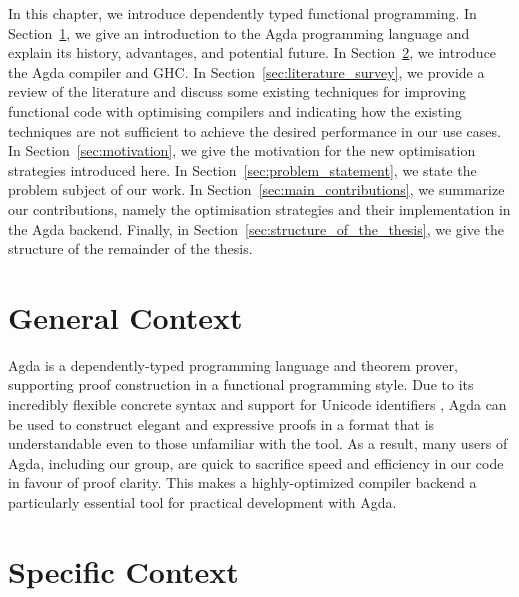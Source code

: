 In this chapter, we introduce dependently typed functional programming. In Section~\ref{sec:general_context}, we give an introduction to the Agda programming language and explain its history, advantages, and potential future. In Section~\ref{sec:specific_context}, we introduce the Agda compiler and GHC. In Section~\ref{sec:literature_survey}, we provide a review of the literature and discuss some existing techniques for improving functional code with optimising compilers and indicating how the existing techniques are not sufficient to achieve the desired performance in our use cases. In Section~\ref{sec:motivation}, we give the motivation for the new optimisation strategies introduced here. In Section~\ref{sec:problem_statement}, we state the problem subject of our work. In Section~\ref{sec:main_contributions}, we summarize our contributions, namely the optimisation strategies and their implementation in the Agda backend. Finally, in Section~\ref{sec:structure_of_the_thesis}, we give the structure of the remainder of the thesis.

\section{General Context}
\label{sec:general_context}

Agda \cite{norell2007} is a dependently-typed programming language and theorem prover, supporting proof construction in a functional programming style. Due to its incredibly flexible concrete syntax and support for Unicode identifiers \cite{bove2009}, Agda can be used to construct elegant and expressive proofs in a format that is understandable even to those unfamiliar with the tool. As a result, many users of Agda, including our group, are quick to sacrifice speed and efficiency in our code in favour of proof clarity. This makes a highly-optimized compiler backend a particularly essential tool for practical development with Agda.\newline


\section{Specific Context}
\label{sec:specific_context}

